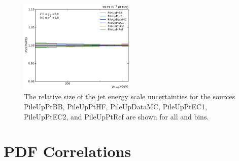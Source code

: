 \begin{figure}[htbp]
    \includegraphics[width=0.49\textwidth]{figures/measurement/jec_relunc_5_yb2ys0.pdf}
    \caption[Split-up of JEC sources: Part VI]{The relative size of the jet energy scale
             uncertainties for the sources PileUpPtBB, PileUpPtHF, PileUpDataMC,
             PileUpPtEC1, PileUpPtEC2, and PileUpPtRef are shown for all \ystar and \yboost bins.}
    \label{fig:jec_relunc_5}
\end{figure}


\section{PDF Correlations}

